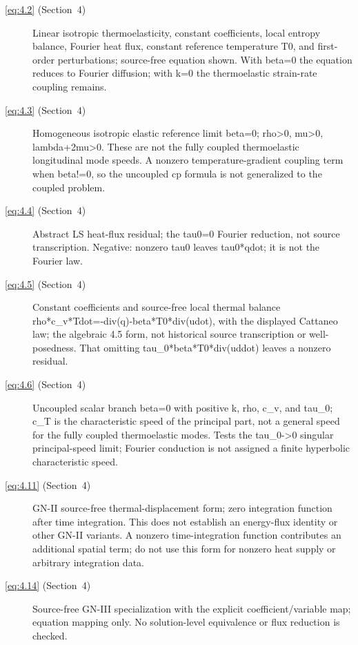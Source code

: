 \begin{description}
  \item[\eqref{eq:4.2} (Section~4)] Linear isotropic thermoelasticity, constant coefficients, local entropy balance, Fourier heat flux, constant reference temperature T0, and first-order perturbations; source-free equation shown. With beta=0 the equation reduces to Fourier diffusion; with k=0 the thermoelastic strain-rate coupling remains.

  \item[\eqref{eq:4.3} (Section~4)] Homogeneous isotropic elastic reference limit beta=0; rho>0, mu>0, lambda+2mu>0. These are not the fully coupled thermoelastic longitudinal mode speeds. A nonzero temperature-gradient coupling term when beta!=0, so the uncoupled cp formula is not generalized to the coupled problem.

  \item[\eqref{eq:4.4} (Section~4)] Abstract LS heat-flux residual; the tau0=0 Fourier reduction, not source transcription. Negative: nonzero tau0 leaves tau0*qdot; it is not the Fourier law.

  \item[\eqref{eq:4.5} (Section~4)] Constant coefficients and source-free local thermal balance rho*c\_v*Tdot=-div(q)-beta*T0*div(udot), with the displayed Cattaneo law; the algebraic 4.5 form, not historical source transcription or well-posedness. That omitting tau\_0*beta*T0*div(uddot) leaves a nonzero residual.

  \item[\eqref{eq:4.6} (Section~4)] Uncoupled scalar branch beta=0 with positive k, rho, c\_v, and tau\_0; c\_T is the characteristic speed of the principal part, not a general speed for the fully coupled thermoelastic modes. Tests the tau\_0->0 singular principal-speed limit; Fourier conduction is not assigned a finite hyperbolic characteristic speed.

  \item[\eqref{eq:4.11} (Section~4)] GN-II source-free thermal-displacement form; zero integration function after time integration. This does not establish an energy-flux identity or other GN-II variants. A nonzero time-integration function contributes an additional spatial term; do not use this form for nonzero heat supply or arbitrary integration data.

  \item[\eqref{eq:4.14} (Section~4)] Source-free GN-III specialization with the explicit coefficient/variable map; equation mapping only. No solution-level equivalence or flux reduction is checked.


\end{description}
